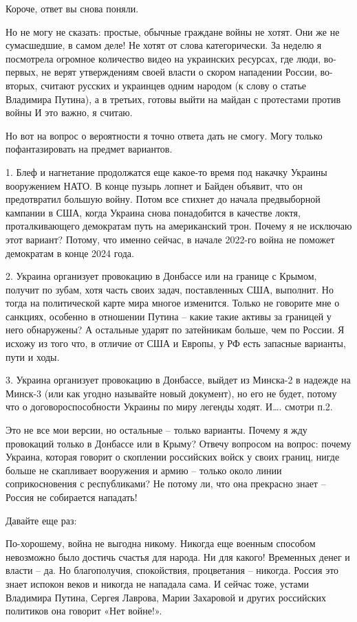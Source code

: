 Короче, ответ вы снова поняли.

Но не могу не сказать: простые, обычные граждане войны не хотят. Они же не
сумасшедшие, в самом деле! Не хотят от слова категорически. За неделю я
посмотрела огромное количество видео на украинских ресурсах, где люди,
во-первых, не верят утверждениям своей власти о скором нападении России,
во-вторых, считают русских и украинцев одним народом (к слову о статье
Владимира Путина), а в третьих, готовы выйти на майдан с протестами против
войны И это важно, я считаю.

Но вот на вопрос о вероятности я точно ответа дать не смогу. Могу только
пофантазировать на предмет вариантов.

1. Блеф и нагнетание продолжатся еще какое-то время под накачку Украины
вооружением НАТО. В конце пузырь лопнет и Байден объявит, что он предотвратил
большую войну. Потом все стихнет до начала предвыборной кампании в США, когда
Украина снова понадобится в качестве локтя, проталкивающего демократам путь на
американский трон. Почему я не исключаю этот вариант? Потому, что именно
сейчас, в начале 2022-го война не поможет демократам в конце 2024 года.

2. Украина организует провокацию в Донбассе или на границе с Крымом, получит по
зубам, хотя часть своих задач, поставленных США, выполнит. Но тогда на
политической карте мира многое изменится. Только не говорите мне о санкциях,
особенно в отношении Путина – какие такие активы за границей у него обнаружены?
А остальные ударят по затейникам больше, чем по России. Я исхожу из того что, в
отличие от США и Европы, у РФ есть запасные варианты, пути и ходы.

3. Украина организует провокацию в Донбассе, выйдет из Минска-2 в надежде на
Минск-3 (или как угодно называйте новый документ), но его не будет, потому что
о договороспособности Украины по миру легенды ходят. И…. смотри п.2.

Это не все мои версии, но остальные – только варианты. Почему я жду провокаций
только в Донбассе или в Крыму? Отвечу вопросом на вопрос: почему Украина,
которая говорит о скоплении российских войск у своих границ, нигде больше не
скапливает вооружения и армию – только около линии соприкосновения с
республиками? Не потому ли, что она прекрасно знает – Россия не собирается
нападать!

Давайте еще раз:

По-хорошему, война не выгодна никому. Никогда еще военным способом невозможно
было достичь счастья для народа. Ни для какого! Временных денег и власти – да.
Но благополучия, спокойствия, процветания – никогда. Россия это знает испокон
веков и никогда не нападала сама. И сейчас тоже, устами Владимира Путина,
Сергея Лаврова, Марии Захаровой и других российских политиков она говорит «Нет
войне!».

